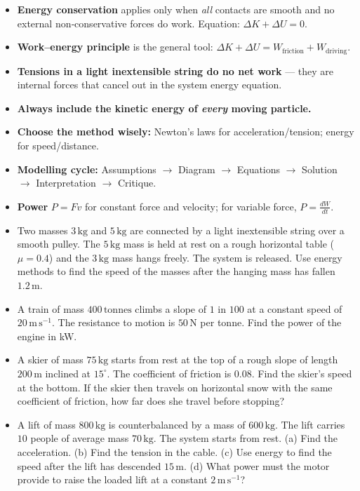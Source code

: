 \documentclass[11pt]{article}
\begin{document}
\begin{aretenir}
\begin{itemize}
\item \textbf{Energy conservation} applies only when \emph{all} contacts are smooth and no external non‑conservative forces do work.  Equation: $\Delta K + \Delta U = 0$.
\item \textbf{Work–energy principle} is the general tool: $\Delta K + \Delta U = W_{\text{friction}} + W_{\text{driving}}$.
\item \textbf{Tensions in a light inextensible string do no net work} — they are internal forces that cancel out in the system energy equation.
\item \textbf{Always include the kinetic energy of \emph{every} moving particle.}
\item \textbf{Choose the method wisely:} Newton's laws for acceleration/tension; energy for speed/distance.
\item \textbf{Modelling cycle:} Assumptions $\rightarrow$ Diagram $\rightarrow$ Equations $\rightarrow$ Solution $\rightarrow$ Interpretation $\rightarrow$ Critique.
\item \textbf{Power} $P = Fv$ for constant force and velocity; for variable force, $P = \frac{dW}{dt}$.
\end{itemize}
\end{aretenir}

\begin{exercice}
\begin{itemize}
\item Two masses $3\,\mathrm{kg}$ and $5\,\mathrm{kg}$ are connected by a light inextensible string over a smooth pulley.  The $5\,\mathrm{kg}$ mass is held at rest on a rough horizontal table ($\mu=0.4$) and the $3\,\mathrm{kg}$ mass hangs freely.  The system is released.  Use energy methods to find the speed of the masses after the hanging mass has fallen $1.2\,\mathrm{m}$.
\item A train of mass $400\,\mathrm{tonnes}$ climbs a slope of $1$ in $100$ at a constant speed of $20\,\mathrm{m\,s^{-1}}$.  The resistance to motion is $50\,\mathrm{N}$ per tonne.  Find the power of the engine in kW.
\item A skier of mass $75\,\mathrm{kg}$ starts from rest at the top of a rough slope of length $200\,\mathrm{m}$ inclined at $15^\circ$.  The coefficient of friction is $0.08$.  Find the skier's speed at the bottom.  If the skier then travels on horizontal snow with the same coefficient of friction, how far does she travel before stopping?
\item A lift of mass $800\,\mathrm{kg}$ is counterbalanced by a mass of $600\,\mathrm{kg}$.  The lift carries $10$ people of average mass $70\,\mathrm{kg}$.  The system starts from rest.  (a) Find the acceleration. (b) Find the tension in the cable. (c) Use energy to find the speed after the lift has descended $15\,\mathrm{m}$. (d) What power must the motor provide to raise the loaded lift at a constant $2\,\mathrm{m\,s^{-1}}$?
\end{itemize}
\end{exercice}
\end{document}
